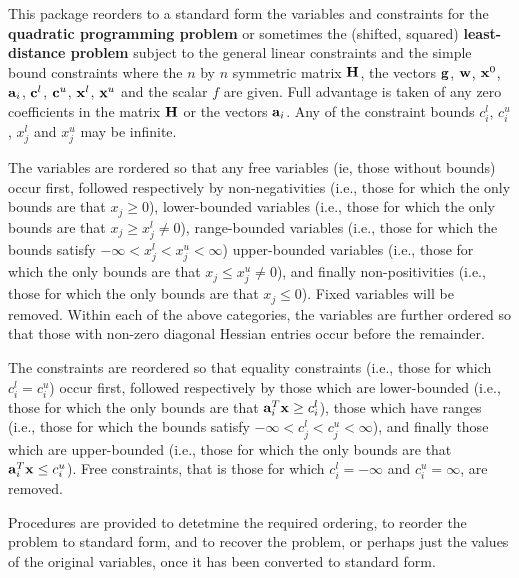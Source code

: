 \documentclass{galahad}
\begin{document}
\galheader


\galsummary
This package reorders to a standard form the variables and constraints
for the {\bf quadratic programming problem}
or sometimes the (shifted, squared) {\bf least-distance problem}
subject to the general linear constraints
and the simple bound constraints
where the $n$ by $n$ symmetric matrix ${\mathbf{H}}$, the 
vectors ${\mathbf{g}}$, ${\mathbf{w}}$, ${\mathbf{x}}^{0}$,
${\mathbf{a}}_{i}$, ${\mathbf{c}}^{l}$, ${\mathbf{c}}^{u}$, ${\mathbf{x}}^{l}$, 
${\mathbf{x}}^{u}$ and the scalar $f$ are given.
Full advantage is taken of any zero coefficients in the matrix ${\mathbf{H}}$ or the
vectors ${\mathbf{a}}_{i}$. 
Any of the constraint bounds $c_{i}^{l}$, $c_{i}^{u}$, 
$x_{j}^{l}$ and $x_{j}^{u}$ may be infinite.

The variables are rordered so that any
free variables (ie, those without bounds) occur first, followed
respectively by 
non-negativities (i.e., those for which the only
bounds are that $x_j \geq 0$),
lower-bounded variables (i.e., those for which the only
bounds are that $x_j \geq x_j^l \neq 0$),
range-bounded variables (i.e., those for which the 
bounds satisfy $- \infty < x_j^l < x_j^u < \infty$)
upper-bounded variables (i.e., those for which the only
bounds are that $x_j \leq x_j^u \neq 0$), and finally
non-positivities (i.e., those for which the only
bounds are that $x_j \leq 0$).
Fixed variables will be removed. Within each of the above categories, 
the variables are further ordered so that those with non-zero diagonal Hessian 
entries occur before the remainder.

The constraints are reordered so that equality constraints (i.e., those
for which $c_i^l = c_i^u$) occur first, followed 
respectively by those 
which are lower-bounded (i.e., those for which the only
bounds are that ${\mathbf{a}}_i^T {\mathbf{x}} \geq c_i^l$),
those which have ranges (i.e., those for which the 
bounds satisfy 
$- \infty < c_j^l < c_j^u < \infty$), 
and finally those which are upper-bounded (i.e., those for which the only
bounds are that ${\mathbf{a}}_i^T {\mathbf{x}} \leq c_i^u$).
Free constraints, that is those for which 
$c_i^l = - \infty$ and $c_i^u = \infty$, are removed.

Procedures are provided to detetmine the required ordering, to
reorder the problem to standard form, and
to recover the problem, or perhaps just the values of
the original variables, once it has been converted to standard form.
\end{document}
